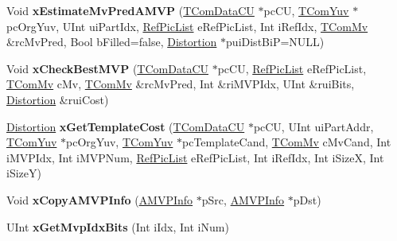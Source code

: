 \begin{DoxyCompactItemize}
Void {\bfseries x\+Estimate\+Mv\+Pred\+A\+M\+VP} (\hyperlink{class_t_com_data_c_u}{T\+Com\+Data\+CU} $\ast$pc\+CU, \hyperlink{class_t_com_yuv}{T\+Com\+Yuv} $\ast$pc\+Org\+Yuv, U\+Int ui\+Part\+Idx, \hyperlink{_type_def_8h_a93cea48eb9dcfd661168dee82e41b384}{Ref\+Pic\+List} e\+Ref\+Pic\+List, Int i\+Ref\+Idx, \hyperlink{class_t_com_mv}{T\+Com\+Mv} \&rc\+Mv\+Pred, Bool b\+Filled=false, \hyperlink{_type_def_8h_aed82b23ef6849d0bc3d95c92102d5b50}{Distortion} $\ast$pui\+Dist\+BiP=N\+U\+LL)
\item 
\mbox{\label{class_t_enc_search_a832d1e84cdfe49cf3af0411a73293fe8}} 
Void {\bfseries x\+Check\+Best\+M\+VP} (\hyperlink{class_t_com_data_c_u}{T\+Com\+Data\+CU} $\ast$pc\+CU, \hyperlink{_type_def_8h_a93cea48eb9dcfd661168dee82e41b384}{Ref\+Pic\+List} e\+Ref\+Pic\+List, \hyperlink{class_t_com_mv}{T\+Com\+Mv} c\+Mv, \hyperlink{class_t_com_mv}{T\+Com\+Mv} \&rc\+Mv\+Pred, Int \&ri\+M\+V\+P\+Idx, U\+Int \&rui\+Bits, \hyperlink{_type_def_8h_aed82b23ef6849d0bc3d95c92102d5b50}{Distortion} \&rui\+Cost)
\item 
\mbox{\label{class_t_enc_search_a8ac7bf001f386eaa5d2016322d5a9239}} 
\hyperlink{_type_def_8h_aed82b23ef6849d0bc3d95c92102d5b50}{Distortion} {\bfseries x\+Get\+Template\+Cost} (\hyperlink{class_t_com_data_c_u}{T\+Com\+Data\+CU} $\ast$pc\+CU, U\+Int ui\+Part\+Addr, \hyperlink{class_t_com_yuv}{T\+Com\+Yuv} $\ast$pc\+Org\+Yuv, \hyperlink{class_t_com_yuv}{T\+Com\+Yuv} $\ast$pc\+Template\+Cand, \hyperlink{class_t_com_mv}{T\+Com\+Mv} c\+Mv\+Cand, Int i\+M\+V\+P\+Idx, Int i\+M\+V\+P\+Num, \hyperlink{_type_def_8h_a93cea48eb9dcfd661168dee82e41b384}{Ref\+Pic\+List} e\+Ref\+Pic\+List, Int i\+Ref\+Idx, Int i\+SizeX, Int i\+SizeY)
\item 
\mbox{\label{class_t_enc_search_a129772ff349ac9f3cf8daf58de65ddb7}} 
Void {\bfseries x\+Copy\+A\+M\+V\+P\+Info} (\hyperlink{_t_com_motion_info_8h_a4dfe7465dec69a9356d5166304173f8c}{A\+M\+V\+P\+Info} $\ast$p\+Src, \hyperlink{_t_com_motion_info_8h_a4dfe7465dec69a9356d5166304173f8c}{A\+M\+V\+P\+Info} $\ast$p\+Dst)
\item 
\mbox{\label{class_t_enc_search_af431070fe6c522dd88cadda1463db5bc}} 
U\+Int {\bfseries x\+Get\+Mvp\+Idx\+Bits} (Int i\+Idx, Int i\+Num)
\item 
\mbox{\label{class_t_enc_search_a3ed3f1269d6715e512631e1e1c3a7a4b}} 

\end{DoxyCompactItemize}
